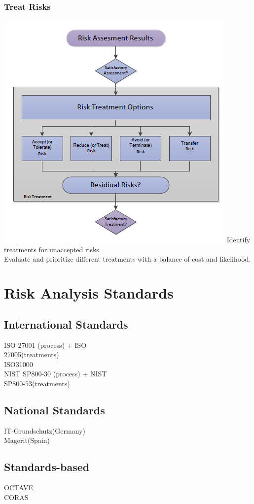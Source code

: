 \documentclass[10pt,a4paper,final]{report}
\begin{document}
\subsubsection{Treat Risks}
\includegraphics[scale=.75]{RiskTreat.png}
Identify treatments for unaccepted risks.\\
Evaluate and prioritize different treatments with a balance of cost and likelihood.
\section{Risk Analysis Standards}
\subsection{International Standards}
ISO 27001 (process) + ISO\\ 27005(treatments)\\
ISO31000\\
NIST SP800-30 (process) + NIST\\ SP800-53(treatments)
\subsection{National Standards}
IT-Grundschutz(Germany)\\
Magerit(Spain)
\subsection{Standards-based}
OCTAVE\\
CORAS
\end{document}
